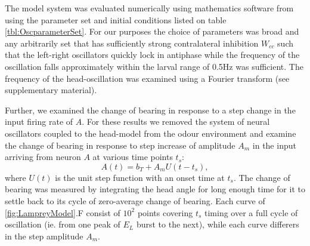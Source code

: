 \documentclass[10pt,a4paper]{article}
\begin{document}
The model system was evaluated numerically using mathematics software from \cite{math}
using the parameter set and initial conditions listed on table \ref{tbl:OscparameterSet}.
 For our purposes the choice of parameters was broad and any arbitrarily set that has sufficiently strong contralateral inhibition $W_{cc}$ such that the left-right oscillators quickly lock in antiphase while the frequency of the oscillation falls approximately within the larval range of 0.5Hz was sufficient. The frequency of the head-oscillation was examined using a Fourier transform (see supplementary material).

Further, we examined the change of bearing in response to a step change in the input firing rate of $A$. For these results we removed the system of neural oscillators coupled to the head-model from the odour environment and examine the change of bearing in response to step increase of amplitude $A_m$ in the input arriving from neuron $A$ at various time points $t_s$:
\begin{equation}
A(t) = b_T + A_m U(t-t_s),
\end{equation}
where $U(t)$ is the unit step function with an onset time at $t_s$. The change of bearing was measured by integrating the head angle for long enough time for it to settle back to its cycle of zero-average change of bearing. Each curve of \ref{fig:LampreyModel}.F consist of $10^2$ points covering $t_s$ timing over a full cycle of oscillation (ie. from one peak of $E_L$ burst to the next), while each curve differers in the step amplitude $A_m$.


\newpage
\end{document}
